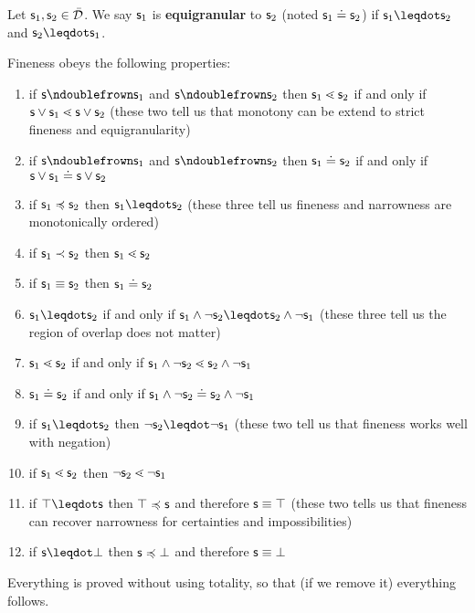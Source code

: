 \documentclass{article}
\begin{document}
\begin{defn}
     Let $\mathsf{s}_1, \mathsf{s}_2 \in \bar{\mathcal{D}}$. We say $\mathsf{s}_1$ is \textbf{equigranular} to $\mathsf{s}_2$ (noted $\mathsf{s}_1 \doteq \mathsf{s}_2$) if $\stmt_1 \finer \stmt_2$ and $\stmt_2 \finer \stmt_1$.
\end{defn}

\begin{prop}\label{fineness_properties}
    Fineness obeys the following properties:
    \begin{enumerate}
        \item if $\stmt \ncomp \stmt_1$ and $\stmt \ncomp \stmt_2$ then $\mathsf{s}_1 \lessdot \mathsf{s}_2$ if and only if $\mathsf{s} \vee \mathsf{s}_1 \lessdot \mathsf{s} \vee \mathsf{s}_2$ (these two tell us that monotony can be extend to strict fineness and equigranularity)
        \item if $\stmt \ncomp \stmt_1$ and $\stmt \ncomp \stmt_2$ then $\mathsf{s}_1 \doteq \mathsf{s}_2$ if and only if $\mathsf{s} \vee \mathsf{s}_1 \doteq \mathsf{s} \vee \mathsf{s}_2$
        \item if $\mathsf{s}_1 \preccurlyeq \mathsf{s}_2$ then $\stmt_1 \finer \stmt_2$ (these three tell us fineness and narrowness are monotonically ordered)
        \item if $\mathsf{s}_1 \prec \mathsf{s}_2$ then $\mathsf{s}_1 \lessdot \mathsf{s}_2$
        \item if $\mathsf{s}_1 \equiv \mathsf{s}_2$ then $\mathsf{s}_1 \doteq \mathsf{s}_2$
        \item $\stmt_1 \finer \stmt_2$ if and only if $\stmt_1 \AND \NOT \stmt_2 \finer \stmt_2 \AND \NOT \stmt_1$ (these three tell us the region of overlap does not matter)
        \item $\mathsf{s}_1 \lessdot \mathsf{s}_2$ if and only if $\mathsf{s}_1 \wedge \neg \mathsf{s}_2 \lessdot \mathsf{s}_2 \wedge \neg \mathsf{s}_1$
        \item $\mathsf{s}_1 \doteq \mathsf{s}_2$ if and only if $\mathsf{s}_1 \wedge \neg \mathsf{s}_2 \doteq \mathsf{s}_2 \wedge \neg \mathsf{s}_1$
        \item if $\stmt_1 \finer \stmt_2$ then $\NOT \stmt_2 \finer \NOT \stmt_1$ (these two tell us that fineness works well with negation)
        \item if $\mathsf{s}_1 \lessdot \mathsf{s}_2$ then $\neg \mathsf{s}_2 \lessdot \neg \mathsf{s}_1$
        \item if $\certainty \finer \stmt$ then $\top \preccurlyeq \mathsf{s}$ and therefore $\mathsf{s} \equiv \top$ (these two tells us that fineness can recover narrowness for certainties and impossibilities)
        \item if $\stmt \finer \impossibility$ then $\mathsf{s} \preccurlyeq \bot$ and therefore $\mathsf{s} \equiv \bot$
    \end{enumerate}
\end{prop}
\begin{remark}
Everything is proved without using totality, so that (if we remove it) everything follows.
\end{remark}
\end{document}
